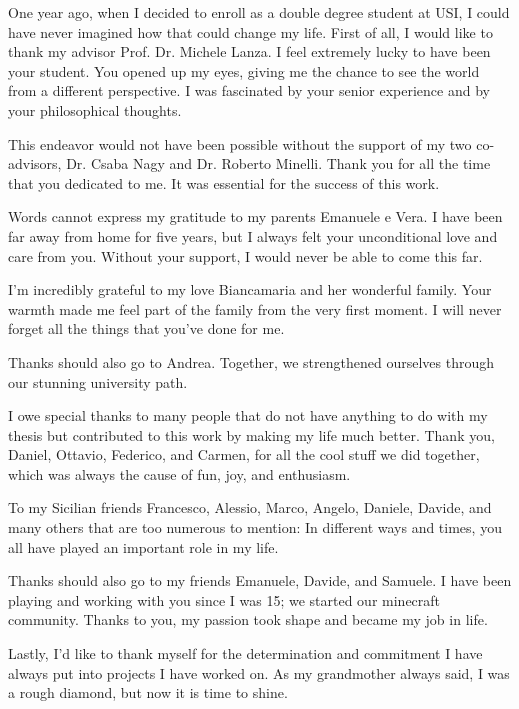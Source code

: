 
\begin{acknowledgements}

\addchaptertocentry{\acknowledgementname}
One year ago, when I decided to enroll as a double degree student at USI, I could have never imagined how that could change my life. First of all, I would like to thank my advisor Prof. Dr. Michele Lanza. I feel extremely lucky to have been your student. You opened up my eyes, giving me the chance to see the world from a different perspective. I was fascinated by your senior experience and by your philosophical thoughts. 

This endeavor would not have been possible without the support of my two co-advisors, Dr. Csaba Nagy and Dr. Roberto Minelli. Thank you for all the time that you dedicated to me. It was essential for the success of this work.

Words cannot express my gratitude to my parents Emanuele e Vera. I have been far away from home for five years, but I always felt your unconditional love and care from you. Without your support, I would never be able to come this far. 

I’m incredibly grateful to my love Biancamaria and her wonderful family. Your warmth made me feel part of the family from the very first moment. I will never forget all the things that you've done for me.   

Thanks should also go to Andrea. Together, we strengthened ourselves through our stunning university path. 

I owe special thanks to many people that do not have anything to do with my thesis but contributed to this work by making my life much better. Thank you, Daniel, Ottavio, Federico, and Carmen, for all the cool stuff we did together, which was always the cause of fun, joy, and enthusiasm.

To my Sicilian friends Francesco, Alessio, Marco, Angelo, Daniele, Davide, and many others that are too numerous to mention: In different ways and times, you all have played an important role in my life. 

Thanks should also go to my friends Emanuele, Davide, and Samuele. I have been playing and working with you since I was 15; we started our minecraft community. Thanks to you, my passion took shape and became my job in life.

Lastly, I’d like to thank myself for the determination and commitment I have always put into projects I have worked on. As my grandmother always said, I was a rough diamond, but now it is time to shine. 


\end{acknowledgements}